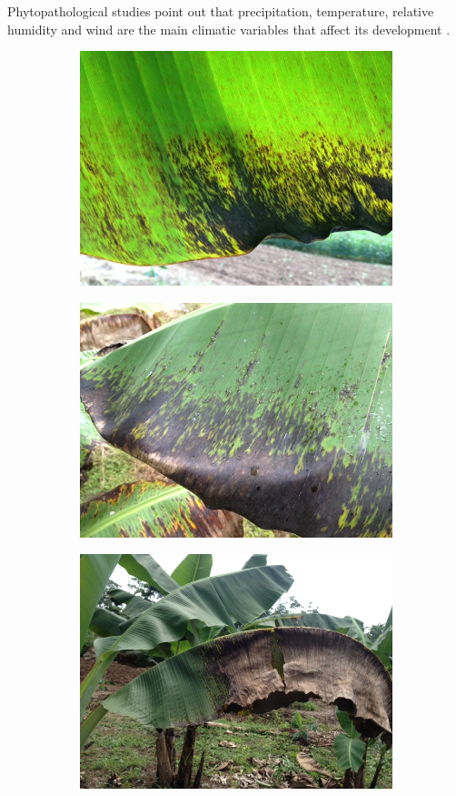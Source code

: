 \documentclass[review]{elsarticle}
\begin{document}
Phytopathological studies point out that precipitation, temperature,
relative humidity and wind are the main climatic variables that affect
its development \citep{MarinVargas1995}.
 	 
\begin{figure}[h] 
\begin{subfigure}{.3\textwidth}
  \centering
  \includegraphics[width=.8\linewidth]{Roya_a}
  \caption{}
  \label{fig:sfig1}
\end{subfigure}
\begin{subfigure}{.3\textwidth}
  \centering
  \includegraphics[width=.8\linewidth]{Roya_b}
  \caption{}
  \label{fig:sfig2}
\end{subfigure}
\begin{subfigure}{.3\textwidth}
  \centering
  \includegraphics[width=.8\linewidth]{Roya_c}

\end{subfigure}
\end{figure}
\end{document}
